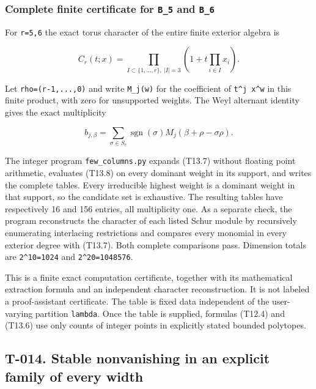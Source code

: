\documentclass[
  10pt,
]{article}
\begin{document}
\subsubsection{\texorpdfstring{Complete finite certificate for
\texttt{\small B\_\allowbreak{}5} and
\texttt{\small B\_\allowbreak{}6}}{Complete finite certificate for  and }}\label{complete-finite-certificate-for-b_5-and-b_6}

For \texttt{\small r=\allowbreak{}5,\allowbreak{}6} the exact torus
character of the entire finite exterior algebra is

\[
C_r(t;x)=\prod_{I\subset\{1,\ldots,r\},\ |I|=3}
\left(1+t\prod_{i\in I}x_i\right).
\tag{T13.7}
\]

Let
\texttt{\small rho=\allowbreak{}(\allowbreak{}r-\allowbreak{}1,\allowbreak{}...,\allowbreak{}0)\allowbreak{}}
and write \texttt{\small M\_\allowbreak{}j(\allowbreak{}w)\allowbreak{}}
for the coefficient of
\texttt{\small t\textasciicircum{}j x\textasciicircum{}w} in this finite
product, with zero for unsupported weights. The Weyl alternant identity
gives the exact multiplicity

\[
b_{j,\beta}=\sum_{\sigma\in S_r}\operatorname{sgn}(\sigma)
M_j(\beta+\rho-\sigma\rho).
\tag{T13.8}
\]

The integer program \texttt{\small few\_\allowbreak{}columns.py} expands
(T13.7) without floating point arithmetic, evaluates (T13.8) on every
dominant weight in its support, and writes the complete tables. Every
irreducible highest weight is a dominant weight in that support, so the
candidate set is exhaustive. The resulting tables have respectively 16
and 156 entries, all multiplicity one. As a separate check, the program
reconstructs the character of each listed Schur module by recursively
enumerating interlacing restrictions and compares every monomial in
every exterior degree with (T13.7). Both complete comparisons pass.
Dimension totals are
\texttt{\small 2\textasciicircum{}10=\allowbreak{}1024} and
\texttt{\small 2\textasciicircum{}20=\allowbreak{}1048576}.

This is a finite exact computation certificate, together with its
mathematical extraction formula and an independent character
reconstruction. It is not labeled a proof-assistant certificate. The
table is fixed data independent of the user-varying partition
\texttt{\small lambda}. Once the table is supplied, formulas (T12.4) and
(T13.6) use only counts of integer points in explicitly stated bounded
polytopes.

\subsection{T-014. Stable nonvanishing in an explicit family of every
width}\label{t-014.-stable-nonvanishing-in-an-explicit-family-of-every-width}
\end{document}

